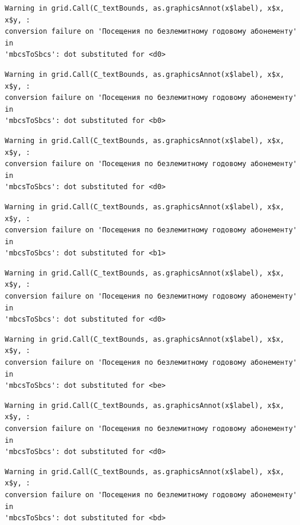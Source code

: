 \documentclass[
  letterpaper,
  DIV=11,
  numbers=noendperiod]{scrartcl}
\begin{document}
\begin{verbatim}
Warning in grid.Call(C_textBounds, as.graphicsAnnot(x$label), x$x, x$y, :
conversion failure on 'Посещения по безлемитному годовому абонементу' in
'mbcsToSbcs': dot substituted for <d0>
\end{verbatim}

\begin{verbatim}
Warning in grid.Call(C_textBounds, as.graphicsAnnot(x$label), x$x, x$y, :
conversion failure on 'Посещения по безлемитному годовому абонементу' in
'mbcsToSbcs': dot substituted for <b0>
\end{verbatim}

\begin{verbatim}
Warning in grid.Call(C_textBounds, as.graphicsAnnot(x$label), x$x, x$y, :
conversion failure on 'Посещения по безлемитному годовому абонементу' in
'mbcsToSbcs': dot substituted for <d0>
\end{verbatim}

\begin{verbatim}
Warning in grid.Call(C_textBounds, as.graphicsAnnot(x$label), x$x, x$y, :
conversion failure on 'Посещения по безлемитному годовому абонементу' in
'mbcsToSbcs': dot substituted for <b1>
\end{verbatim}

\begin{verbatim}
Warning in grid.Call(C_textBounds, as.graphicsAnnot(x$label), x$x, x$y, :
conversion failure on 'Посещения по безлемитному годовому абонементу' in
'mbcsToSbcs': dot substituted for <d0>
\end{verbatim}

\begin{verbatim}
Warning in grid.Call(C_textBounds, as.graphicsAnnot(x$label), x$x, x$y, :
conversion failure on 'Посещения по безлемитному годовому абонементу' in
'mbcsToSbcs': dot substituted for <be>
\end{verbatim}

\begin{verbatim}
Warning in grid.Call(C_textBounds, as.graphicsAnnot(x$label), x$x, x$y, :
conversion failure on 'Посещения по безлемитному годовому абонементу' in
'mbcsToSbcs': dot substituted for <d0>
\end{verbatim}

\begin{verbatim}
Warning in grid.Call(C_textBounds, as.graphicsAnnot(x$label), x$x, x$y, :
conversion failure on 'Посещения по безлемитному годовому абонементу' in
'mbcsToSbcs': dot substituted for <bd>
\end{verbatim}
\end{document}
